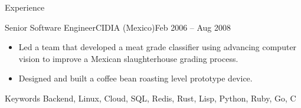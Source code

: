 \documentclass[colibri]{mcdowellcv}
\begin{document}
\begin{cvsection}{Experience}
\begin{cvsubsection}{Senior Software Engineer}{CIDIA (Mexico)}{Feb 2006 -- Aug 2008}
\begin{itemize}
      Created an image processing, analysis, and 3D rendering app to aid optical
      profilometry research.
    \item
      Led a team that developed a meat grade classifier using advancing computer
      vision to improve a Mexican slaughterhouse grading process.
    \item
      Designed and built a coffee bean roasting level prototype device.
		\end{itemize}
	\end{cvsubsection}
  \begin{cvsubsection}{Keywords}{}{}
    Backend, Linux, Cloud, SQL, Redis, Rust, Lisp, Python, Ruby, Go, C
  \end{cvsubsection}
\end{cvsection}
\end{document}
